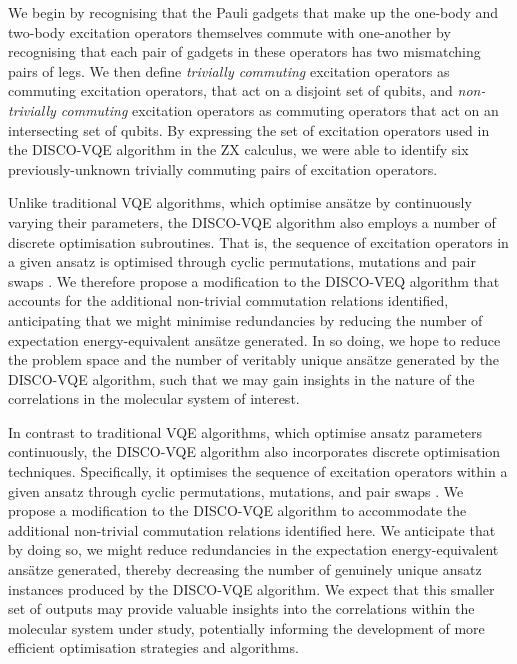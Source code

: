 We begin by recognising that the Pauli gadgets that make up the one-body and two-body excitation operators themselves commute with one-another by recognising that each pair of gadgets in these operators has two mismatching pairs of legs. We then define \textit{trivially commuting} excitation operators as commuting excitation operators, that act on a disjoint set of qubits, and \textit{non-trivially commuting} excitation operators as commuting operators that act on an intersecting set of qubits. By expressing the set of excitation operators used in the DISCO-VQE algorithm in the ZX calculus, we were able to identify six previously-unknown trivially commuting pairs of excitation operators.

Unlike traditional VQE algorithms, which optimise ansätze by continuously varying their parameters, the DISCO-VQE algorithm also employs a number of discrete optimisation subroutines. That is, the sequence of excitation operators in a given ansatz is optimised through cyclic permutations, mutations and pair swaps \cite{Burton2023}. We therefore propose a modification to the DISCO-VEQ algorithm that accounts for the additional non-trivial commutation relations identified, anticipating that we might minimise redundancies by reducing the number of expectation energy-equivalent ansätze generated. In so doing, we hope to reduce the problem space and the number of veritably unique ansätze generated by the DISCO-VQE algorithm, such that we may gain insights in the nature of the correlations in the molecular system of interest.

In contrast to traditional VQE algorithms, which optimise ansatz parameters continuously, the DISCO-VQE algorithm also incorporates discrete optimisation techniques. Specifically, it optimises the sequence of excitation operators within a given ansatz through cyclic permutations, mutations, and pair swaps \cite{Burton2023}. We propose a modification to the DISCO-VQE algorithm to accommodate the additional non-trivial commutation relations identified here. We anticipate that by doing so, we might reduce redundancies in the expectation energy-equivalent ansätze generated, thereby decreasing the number of genuinely unique ansatz instances produced by the DISCO-VQE algorithm. We expect that this smaller set of outputs may provide valuable insights into the correlations within the molecular system under study, potentially informing the development of more efficient optimisation strategies and algorithms.
